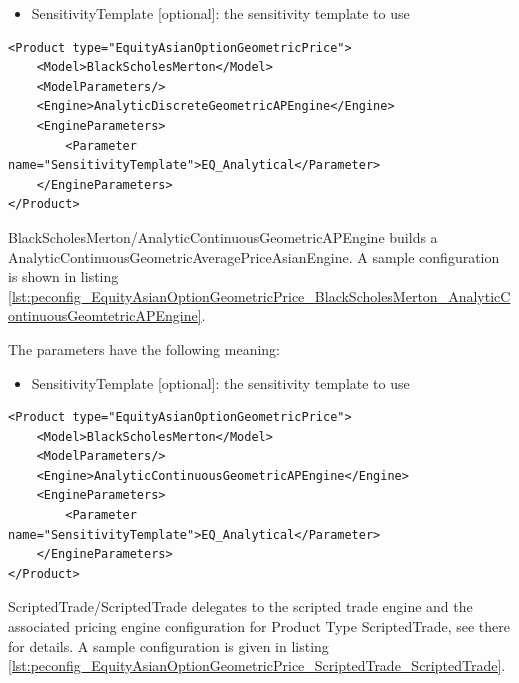 \begin{itemize}
\item SensitivityTemplate [optional]: the sensitivity template to use
\end{itemize}

\begin{longlisting}
\begin{verbatim}
<Product type="EquityAsianOptionGeometricPrice">
    <Model>BlackScholesMerton</Model>
    <ModelParameters/>
    <Engine>AnalyticDiscreteGeometricAPEngine</Engine>
    <EngineParameters>
        <Parameter name="SensitivityTemplate">EQ_Analytical</Parameter>
    </EngineParameters>
</Product>
\end{verbatim}
\caption{Configuration for Product EquityAsianOptionGeometricPrice, Model BlackScholesMerton, Engine AnalyticDiscreteGeomtetricAPEngine}
\label{lst:peconfig_EquityAsianOptionGeometricPrice_BlackScholesMerton_AnalyticDiscreteGeomtetricAPEngine}
\end{longlisting}

BlackScholesMerton/AnalyticContinuousGeometricAPEngine builds a AnalyticContinuousGeometricAveragePriceAsianEngine. A sample
configuration is shown in listing
\ref{lst:peconfig_EquityAsianOptionGeometricPrice_BlackScholesMerton_AnalyticContinuousGeomtetricAPEngine}.

The parameters have the following meaning:

\begin{itemize}
\item SensitivityTemplate [optional]: the sensitivity template to use
\end{itemize}

\begin{longlisting}
\begin{verbatim}
<Product type="EquityAsianOptionGeometricPrice">
    <Model>BlackScholesMerton</Model>
    <ModelParameters/>
    <Engine>AnalyticContinuousGeometricAPEngine</Engine>
    <EngineParameters>
        <Parameter name="SensitivityTemplate">EQ_Analytical</Parameter>
    </EngineParameters>
</Product>
\end{verbatim}
\caption{Configuration for Product EquityAsianOptionGeometricPrice, Model BlackScholesMerton, Engine AnalyticContinuousGeomtetricAPEngine}
\label{lst:peconfig_EquityAsianOptionGeometricPrice_BlackScholesMerton_AnalyticContinuousGeomtetricAPEngine}
\end{longlisting}

ScriptedTrade/ScriptedTrade delegates to the scripted trade engine and the associated pricing engine configuration for
Product Type ScriptedTrade, see there for details. A sample configuration is given in listing
\ref{lst:peconfig_EquityAsianOptionGeometricPrice_ScriptedTrade_ScriptedTrade}.

